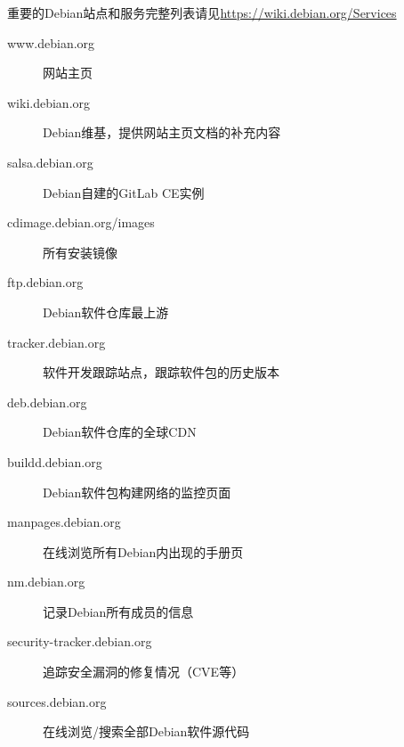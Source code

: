 
\begin{frame}{重要的Debian站点和服务}{完整列表请见\url{https://wiki.debian.org/Services}}
	\begin{description}
		\item[www.debian.org] 网站主页
		\item[wiki.debian.org] Debian维基，提供网站主页文档的补充内容
		\item[salsa.debian.org] Debian自建的GitLab CE实例
		\item[cdimage.debian.org/images] 所有安装镜像
		\item[ftp.debian.org] Debian软件仓库最上游
		\item[tracker.debian.org] 软件开发跟踪站点，跟踪软件包的历史版本
		\item[deb.debian.org] Debian软件仓库的全球CDN
		\item[buildd.debian.org] Debian软件包构建网络的监控页面
		\item[manpages.debian.org] 在线浏览所有Debian内出现的手册页
		\item[nm.debian.org] 记录Debian所有成员的信息
		\item[security-tracker.debian.org] 追踪安全漏洞的修复情况（CVE等）
		\item[sources.debian.org] 在线浏览/搜索全部Debian软件源代码
	\end{description}
	
\end{frame}